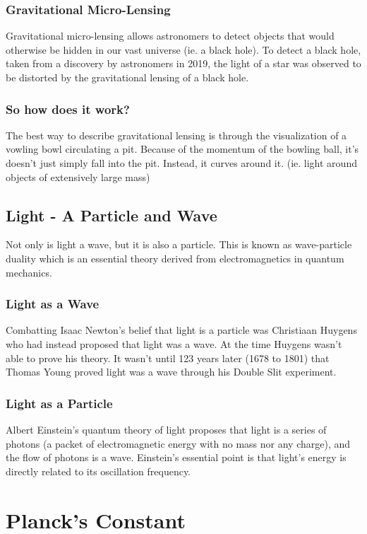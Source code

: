 \documentclass{article}
\begin{document}
\subsubsection{Gravitational Micro-Lensing}
Gravitational micro-lensing allows astronomers to detect objects that would otherwise be hidden in our vast universe (ie. a black hole). To detect a black hole, taken from a discovery by astronomers in 2019, the light of a star was observed to be distorted by the gravitational lensing of a black hole.

\subsubsection{So how does it work?}
The best way to describe gravitational lensing is through the visualization of a vowling bowl circulating a pit. Because of the momentum of the bowling ball, it's doesn't just simply fall into the pit. Instead, it curves around it. (ie. light around objects of extensively large mass)

\subsection{Light - A Particle and Wave}
Not only is light a wave, but it is also a particle. This is known as wave-particle duality which is an essential theory derived from electromagnetics in quantum mechanics.

\subsubsection{Light as a Wave}
Combatting Isaac Newton's belief that light is a particle was Christiaan Huygens who had instead proposed that light was a wave. At the time Huygens wasn't able to prove his theory. It wasn't until 123 years later (1678 to 1801) that Thomas Young proved light was a wave through his Double Slit experiment.

\subsubsection{Light as a Particle}
Albert Einstein's quantum theory of light proposes that light is a series of photons (a packet of electromagnetic energy with no mass nor any charge), and the flow of photons is a wave. Einstein's essential point is that light's energy is directly related to its oscillation frequency.



\section{Planck's Constant}
\end{document}
